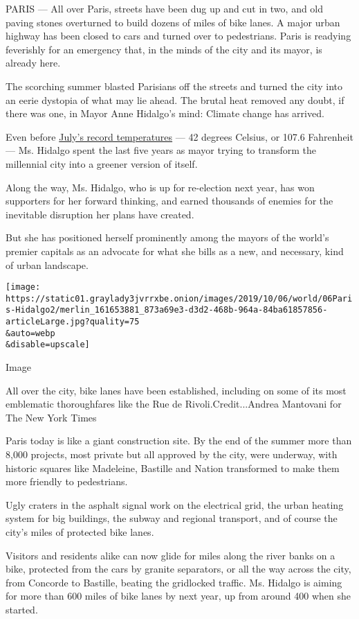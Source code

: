 PARIS --- All over Paris, streets have been dug up and cut in two, and
old paving stones overturned to build dozens of miles of bike lanes. A
major urban highway has been closed to cars and turned over to
pedestrians. Paris is readying feverishly for an emergency that, in the
minds of the city and its mayor, is already here.

The scorching summer blasted Parisians off the streets and turned the
city into an eerie dystopia of what may lie ahead. The brutal heat
removed any doubt, if there was one, in Mayor Anne Hidalgo's mind:
Climate change has arrived.

Even before
\href{https://www.nytimes3xbfgragh.onion/2019/07/24/world/europe/record-temperatures-heatwave.html?searchResultPosition=5}{July's
record temperatures} --- 42 degrees Celsius, or 107.6 Fahrenheit --- Ms.
Hidalgo spent the last five years as mayor trying to transform the
millennial city into a greener version of itself.

Along the way, Ms. Hidalgo, who is up for re-election next year, has won
supporters for her forward thinking, and earned thousands of enemies for
the inevitable disruption her plans have created.

But she has positioned herself prominently among the mayors of the
world's premier capitals as an advocate for what she bills as a new, and
necessary, kind of urban landscape.

\texttt{[image: https://static01.graylady3jvrrxbe.onion/images/2019/10/06/world/06Paris-Hidalgo2/merlin\_161653881\_873a69e3-d3d2-468b-964a-84ba61857856-articleLarge.jpg?quality=75\\\&auto=webp\\\&disable=upscale]}

Image

All over the city, bike lanes have been established, including on some
of its most emblematic thoroughfares like the Rue de
Rivoli.Credit...Andrea Mantovani for The New York Times

Paris today is like a giant construction site. By the end of the summer
more than 8,000 projects, most private but all approved by the city,
were underway, with historic squares like Madeleine, Bastille and Nation
transformed to make them more friendly to pedestrians.

Ugly craters in the asphalt signal work on the electrical grid, the
urban heating system for big buildings, the subway and regional
transport, and of course the city's miles of protected bike lanes.

Visitors and residents alike can now glide for miles along the river
banks on a bike, protected from the cars by granite separators, or all
the way across the city, from Concorde to Bastille, beating the
gridlocked traffic. Ms. Hidalgo is aiming for more than 600 miles of
bike lanes by next year, up from around 400 when she started.

